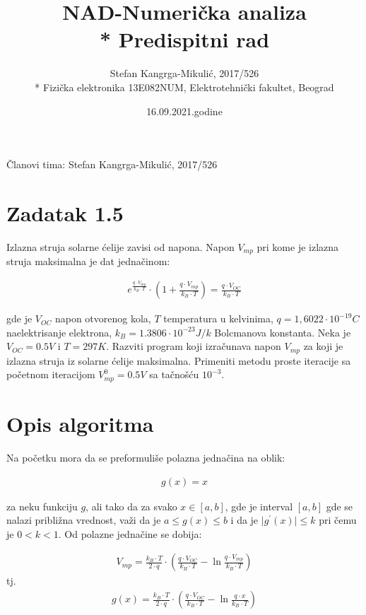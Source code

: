 \documentclass[12pt,leqno,a4paper]{article}
\title{\color{deepblue}  NAD-Numeri\v cka analiza\\* Predispitni rad }
\author{\color{deepred} Stefan Kangrga-Mikuli\' c, 2017/526 \\* \color{deepred} Fizi\v cka elektronika 13E082NUM, Elektrotehni\v cki fakultet, Beograd }
\date{16.09.2021.godine}
\begin{document}
\maketitle

\v Clanovi tima: Stefan Kangrga-Mikuli\' c, 2017/526

\section*{Zadatak 1.5} 

Izlazna struja solarne \' celije zavisi od napona. Napon $V_{mp}$ pri kome je izlazna struja maksimalna je dat jedna\v cinom:

\begin{equation*}
  \begin{aligned}
   e^{\frac{q \cdot V_{mp}}{k_{B} \cdot T}} \cdot (1 + \frac{q \cdot V_{mp}}{k_{B} \cdot T}) = \frac{q \cdot V_{OC}}{k_{B} \cdot T}
 \end{aligned}
\end{equation*}

gde je $V_{OC}$ napon otvorenog kola, $T$ temperatura u kelvinima, $q = 1,6022 \cdot 10^{-19} C$ naelektrisanje elektrona, $k_{B} = 1.3806 \cdot 10^{-23} J/k$ Bolcmanova konstanta. Neka je $V_{OC} = 0.5 V$ i $T=297 K$. Razviti program koji izra\v cunava napon $V_{mp}$ za koji je izlazna struja iz solarne \' celije maksimalna. Primeniti metodu proste iteracije sa po\v cetnom iteracijom $V_{mp}^{0}=0.5 V$ sa ta\v cno\v s\' cu $10^{-3}$.

\section{Opis algoritma}%

Na po\v cetku mora da se preformuli\v se polazna jedna\v cina na oblik:

\begin{equation*}
  \begin{aligned}
    g(x)=x
 \end{aligned}
\end{equation*}

za neku funkciju $g$, ali tako da za svako $x \in [a,b]$, gde je interval $[a, b]$ gde se nalazi pribli\v zna vrednost, va\v zi da je $a \leq g(x) \leq b$ i da je $\mid g^{\prime}(x) \mid \leq k$ pri \v cemu je $0<k<1$.
Od polazne jedna\v cine se dobija:

\begin{equation*}
  \begin{aligned}
   V_{mp}=\frac{k_{B} \cdot T}{2 \cdot q} \cdot (\frac{q \cdot V_{OC}}{k_{B} \cdot T} - \ln{\frac{q \cdot V_{mp}}{k_{B} \cdot T}})
 \end{aligned}
\end{equation*}
tj. 
\begin{equation*}
  \begin{aligned}
   g(x)=\frac{k_{B} \cdot T}{2 \cdot q} \cdot (\frac{q \cdot V_{OC}}{k_{B} \cdot T} - \ln{\frac{q \cdot x}{k_{B} \cdot T}})
 \end{aligned}
\end{equation*}
 
\end{document}
